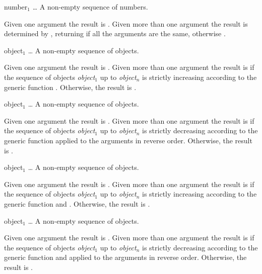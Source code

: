 \begin{optDefinition}
\function{!=}
%
\begin{arguments}
    \item[{number$_1$ \ldots}] A non-empty sequence of numbers.
\end{arguments}
%
\result%
Given one argument the result is \nil{}.  Given more than one argument the
result is determined by , returning \nil{} if all the
arguments are the same, otherwise \true{}.

\function{<}
%
\begin{arguments}
    \item[object$_1$ \ldots] A non-empty sequence of objects.
\end{arguments}
%
\result%
Given one argument the result is \true{}.  Given more than one argument the
result is \true{} if the sequence of objects {\em object$_1$} up to {\em
    object$_n$} is strictly increasing according to the generic function
.  Otherwise, the result is \nil{}.

\function{>}
%
\begin{arguments}
    \item[object$_1$ \ldots] A non-empty sequence of objects.
\end{arguments}
%
\result%
Given one argument the result is \true{}.  Given more than one argument the
result is \true{} if the sequence of objects {\em object$_1$} up to {\em
    object$_n$} is strictly decreasing according to the generic function
 applied to the arguments in reverse order.  Otherwise, the
result is \nil{}.

\function{<=}
%
\begin{arguments}
    \item[object$_1$ \ldots] A non-empty sequence of objects.
\end{arguments}
%
\result%
Given one argument the result is \true{}.  Given more than one argument the
result is \true{} if the sequence of objects {\em object$_1$} up to {\em
    object$_n$} is strictly increasing according to the generic function
 and .  Otherwise, the result is \nil{}.

\function{>=}
%
\begin{arguments}
    \item[object$_1$ \ldots] A non-empty sequence of objects.
\end{arguments}
%
\result%
Given one argument the result is \true{}.  Given more than one argument the
result is \true{} if the sequence of objects {\em object$_1$} up to {\em
    object$_n$} is strictly decreasing according to the generic function
 and  applied to the arguments in
reverse order.  Otherwise, the result is \nil{}.


\end{optDefinition}
